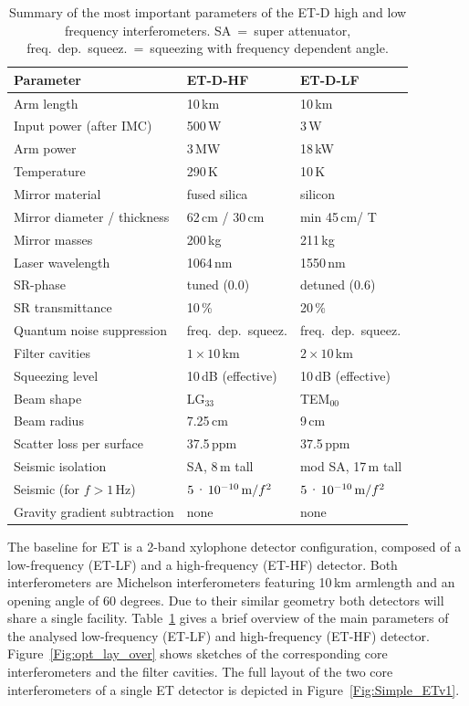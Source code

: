 \begin{table}
\begin{center}
\begin{tabular}{l l l}
\hline
\hline
Parameter & ET-D-HF   & ET-D-LF \\
\hline
Arm length & 10\,km & 10\,km \\
Input power (after IMC) & 500\,W & 3\,W \\
Arm power & 3\,MW & 18\,kW\\
Temperature & 290\,K &  10\,K  \\
Mirror material & fused silica & silicon \\
Mirror diameter / thickness & 62\,cm / 30\,cm & min 45\,cm/ T \\
Mirror masses & 200\,kg & 211\,kg \\
Laser wavelength & 1064\,nm & 1550\,nm \\
SR-phase & tuned (0.0) & detuned (0.6)\\
SR transmittance & 10\,\% & 20\,\% \\
Quantum noise suppression &  freq.\ dep.\ squeez.& freq.\ dep.\ squeez.\\
Filter cavities & $1 \times 10\,$km  & $2 \times 10\,$km\\
Squeezing level  & 10\,dB (effective) & 10\,dB (effective) \\
Beam shape &  LG$_{33}$& TEM$_{00}$\\
Beam radius & 7.25\,cm & 9\,cm \\
Scatter loss per surface & 37.5\,ppm & 37.5\,ppm \\
Seismic isolation & SA, 8\,m tall & mod SA, 17\,m tall \\
Seismic (for $f>1$\,Hz) & $5\cdot 10^{-10}\,{\rm m}/f^2$ & $5\cdot 10^{-10}\,{\rm m}/f^2$  \\
Gravity gradient subtraction & none & none \\
\hline
\hline
\end{tabular}
\caption{Summary of the most important parameters of the ET-D high and low frequency interferometers. SA~=~super attenuator,  freq.\ dep.\ squeez.~=~squeezing with frequency dependent angle.\label{tab:summary14}}
\end{center}
\end{table}

The baseline for ET is a 2-band xylophone detector configuration, composed of a low-frequency (ET-LF) and a high-frequency (ET-HF) detector. Both interferometers are Michelson interferometers featuring 10\,km armlength and an opening
angle of 60 degrees.  Due to their similar geometry both detectors will share a single facility. Table~\ref{tab:summary14} gives a brief overview of the main parameters of the analysed low-frequency (ET-LF) and high-frequency (ET-HF) detector. Figure~\ref{Fig:opt_lay_over}   shows sketches of the corresponding core interferometers and the filter cavities. The full layout of the two core interferometers of a single ET detector is depicted in Figure~\ref{Fig:Simple_ETv1}.


